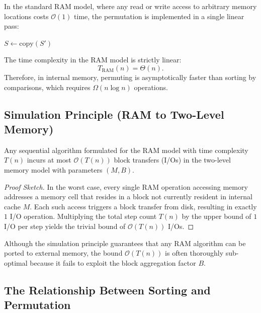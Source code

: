 In the standard RAM model, where any read or write access to arbitrary memory locations costs $\mathcal{O}(1)$ time, the permutation is implemented in a single linear pass:

\begin{algorithm}[H]
  \DontPrintSemicolon
  $S \leftarrow \mathrm{copy}(S')$\;
  \caption{Direct Permutation on RAM}
\end{algorithm}

The time complexity in the RAM model is strictly linear:
\[
  T_{\mathrm{RAM}}(n) = \Theta(n).
\]
Therefore, in internal memory, permuting is asymptotically faster than sorting by comparisons, which requires $\Omega(n \log n)$ operations.

\subsection{Simulation Principle (RAM to Two-Level Memory)}
\label{subsec:simulation-principle}

\begin{theorem}
\label{thm:simulation}
Any sequential algorithm formulated for the RAM model with time complexity $T(n)$ incurs at most $\mathcal{O}(T(n))$ block transfers (I/Os) in the two-level memory model with parameters $(M, B)$.
\end{theorem}

\begin{proof}[Proof Sketch]
In the worst case, every single RAM operation accessing memory addresses a memory cell that resides in a block not currently resident in internal cache $M$. Each such access triggers a block transfer from disk, resulting in exactly $1$ I/O operation. Multiplying the total step count $T(n)$ by the upper bound of $1$ I/O per step yields the trivial bound of $\mathcal{O}(T(n))$ I/Os.
\end{proof}

Although the simulation principle guarantees that any RAM algorithm can be ported to external memory, the bound $\mathcal{O}(T(n))$ is often thoroughly sub-optimal because it fails to exploit the block aggregation factor $B$.

\subsection{The Relationship Between Sorting and Permutation}
\label{subsec:relationship-sort-perm}

